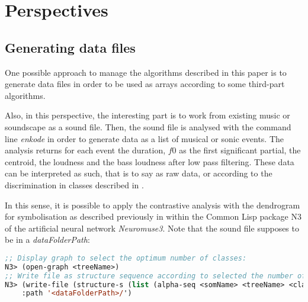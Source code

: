 \section{Perspectives}
\label{Perspective}

\subsection{Generating data files}
\label{gdf}

One possible approach to manage the algorithms described in this paper is to generate data files in order to be used as arrays according to some third-part algorithms. 

Also, in this perspective, the interesting part is to work from existing music or soundscape as a sound file. Then, the sound file is analysed with the command line \textsl{enkode} in order to generate data as a list of musical or sonic events. The analysis returns for each event the duration, $f0$ as the first significant partial, the centroid, the loudness and the bass loudness after low pass filtering. These data can be interpreted as such, that is to say as raw data, or according to the discrimination in classes described in . 

\smallskip

In this sense, it is possible to apply the contrastive analysis with the dendrogram for symbolisation as described previously in  within the Common Lisp package N3 of the artificial neural network \textsl{Neuromuse3}.
Note that the sound file supposes to be in a \textsl{dataFolderPath}:

\smallskip

 \begin{lstlisting}[basicstyle=\footnotesize\ttfamily,language=Lisp]
;; Display graph to select the optimum number of classes:
N3> (open-graph <treeName>)
;; Write file as structure sequence according to selected the number of classes:
N3> (write-file (structure-s (list (alpha-seq <somName> <treeName> <classesNumber>)) :result :last) :name '<fileName>.dat' 
    :path '<dataFolderPath>/')
\end{lstlisting}

